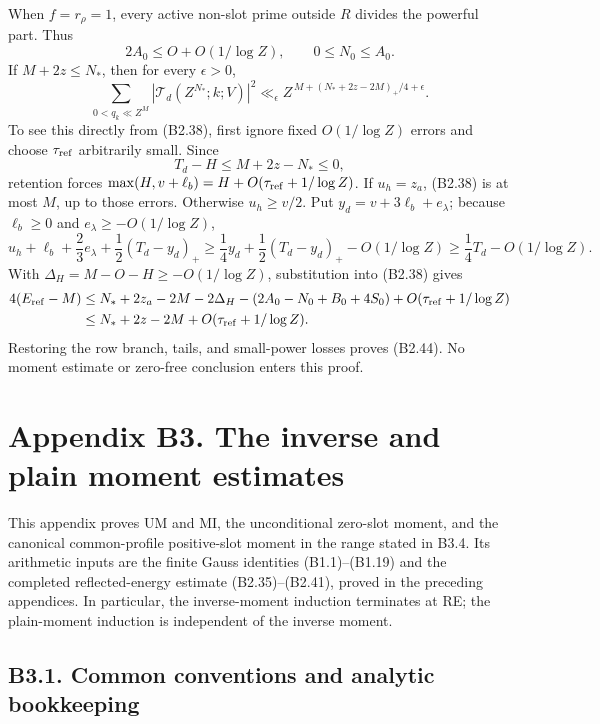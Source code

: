 \documentclass[11pt,a4paper]{article}
\begin{document}
When \(f=r_\rho=1\), every active non-slot prime outside \(R\) divides
the powerful part. Thus \[
2A_0\le O+O(1/\log Z),\qquad 0\le N_0\le A_0.
\] If \(M+2z\le N_*\), then for every \(\epsilon>0\), \[
\sum_{0<q_k\ll Z^M}|\mathcal T_d(Z^{N_*};k;V)|^2
\ll_\epsilon
Z^{\,M+(N_*+2z-2M)_+/4+\epsilon}.
\tag{B2.44}
\] To see this directly from (B2.38), first ignore fixed \(O(1/\log Z)\)
errors and choose \(\tau_{\rm ref}\) arbitrarily small. Since \[
T_d-H\le M+2z-N_*\le0,
\] retention forces \(\max(H,\allowbreak{}v+\ell_b)=H+O(\tau_{\rm ref}+1/\log Z)\).
If \(u_h=z_a\), (B2.38) is at most \(M\), up to those errors. Otherwise
\(u_h\ge v/2\). Put \(y_d=v+3\ell_b+e_\lambda\); because \(\ell_b\ge0\)
and \(e_\lambda\ge-O(1/\log Z)\), \[
u_h+\ell_b+\frac23e_\lambda
+\frac12(T_d-y_d)_+
\ge \frac14y_d+\frac12(T_d-y_d)_+-O(1/\log Z)
\ge\frac14T_d-O(1/\log Z).
\] With \(\Delta_H=M-O-H\ge-O(1/\log Z)\), substitution into (B2.38)
gives \[
\begin{aligned}
4(E_{\rm ref}-M)
&\le N_*+2z_a-2M-2\Delta_H
-(2A_0-N_0+B_0+4S_0)+O(\tau_{\rm ref}+1/\log Z)\\
&\le N_*+2z-2M+O(\tau_{\rm ref}+1/\log Z).
\end{aligned}
\] Restoring the row branch, tails, and small-power losses proves
(B2.44). No moment estimate or zero-free conclusion enters this proof.

\hypertarget{appendix-b3.-the-inverse-and-plain-moment-estimates}{%
\section{Appendix B3. The inverse and plain moment
estimates}\label{appendix-b3.-the-inverse-and-plain-moment-estimates}}

This appendix proves UM and MI, the unconditional zero-slot moment, and
the canonical common-profile positive-slot moment in the range stated in
B3.4. Its arithmetic inputs are the finite Gauss identities
(B1.1)--(B1.19) and the completed reflected-energy estimate
(B2.35)--(B2.41), proved in the preceding appendices. In particular, the
inverse-moment induction terminates at RE; the plain-moment induction is
independent of the inverse moment.

\hypertarget{b3.1.-common-conventions-and-analytic-bookkeeping}{%
\subsection{B3.1. Common conventions and analytic
bookkeeping}\label{b3.1.-common-conventions-and-analytic-bookkeeping}}
\end{document}
